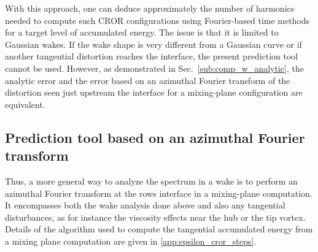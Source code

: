 With this approach, one can deduce approximately
the number of harmonics needed to compute such CROR
configurations using Fourier-based time methods for a target level
of accumulated energy. The issue is that it is limited to
Gaussian wakes. If the wake shape is very different from a Gaussian
curve or if another tangential
distortion reaches the interface, the present
prediction tool cannot be used. 
However, as demonstrated in Sec.~\ref{sub:comp_w_analytic},
the analytic error and the error based on an
azimuthal Fourier transform of the distortion
seen just upstream the interface for a mixing-plane
configuration are equivalent. 


\subsection{Prediction tool based on an azimuthal Fourier transform}
\label{sub:prediction_tool_azimuthal_fft}
Thus, a more general way to analyze the spectrum in a wake is
to perform an azimuthal Fourier transform at the rows interface
in a mixing-plane computation. It encompasses both the wake analysis done above and also
any tangential disturbances, as for instance
the viscosity effects near the hub or the tip vortex.
Details of the algorithm used to compute the tangential accumulated
energy from a mixing plane computation are given in \ref{app:epsilon_cror_steps}.


